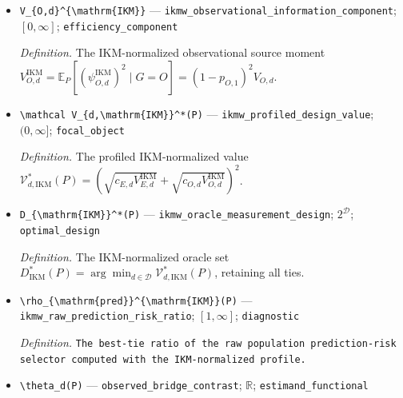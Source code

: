 \documentclass{article}
\begin{document}
\begin{itemize}
  \par\smallskip\noindent\emph{Definition.} The IKM-normalized experimental source moment \(V_{E,d}^{\mathrm{IKM}}=\mathbb E_P[(\psi_{E,d}^{\mathrm{IKM}})^2\mid G=E]=(1-p_{E,1})^2V_{E,d}\).
  \item \texttt{V\_\allowbreak{}\{O,\allowbreak{}d\}\allowbreak{}\textasciicircum{}\{\textbackslash{}\allowbreak{}mathrm\{IKM\}\allowbreak{}\}\allowbreak{}} --- \texttt{ikmw\_\allowbreak{}observational\_\allowbreak{}information\_\allowbreak{}component}; \([0,\infty]\); \texttt{efficiency\_\allowbreak{}component}
  \par\smallskip\noindent\emph{Definition.} The IKM-normalized observational source moment \(V_{O,d}^{\mathrm{IKM}}=\mathbb E_P[(\psi_{O,d}^{\mathrm{IKM}})^2\mid G=O]=(1-p_{O,1})^2V_{O,d}\).
  \item \texttt{\textbackslash{}\allowbreak{}mathcal V\_\allowbreak{}\{d,\allowbreak{}\textbackslash{}\allowbreak{}mathrm\{IKM\}\allowbreak{}\}\allowbreak{}\textasciicircum{}*(P)} --- \texttt{ikmw\_\allowbreak{}profiled\_\allowbreak{}design\_\allowbreak{}value}; \((0,\infty]\); \texttt{focal\_\allowbreak{}object}
  \par\smallskip\noindent\emph{Definition.} The profiled IKM-normalized value \(\mathcal V_{d,\mathrm{IKM}}^*(P)=(\sqrt{c_{E,d}V_{E,d}^{\mathrm{IKM}}}+\sqrt{c_{O,d}V_{O,d}^{\mathrm{IKM}}})^2\).
  \item \texttt{D\_\allowbreak{}\{\textbackslash{}\allowbreak{}mathrm\{IKM\}\allowbreak{}\}\allowbreak{}\textasciicircum{}*(P)} --- \texttt{ikmw\_\allowbreak{}oracle\_\allowbreak{}measurement\_\allowbreak{}design}; \(2^{\mathcal D}\); \texttt{optimal\_\allowbreak{}design}
  \par\smallskip\noindent\emph{Definition.} The IKM-normalized oracle set \(D_{\mathrm{IKM}}^*(P)=\arg\min_{d\in\mathcal D}\mathcal V_{d,\mathrm{IKM}}^*(P)\), retaining all ties.
  \item \texttt{\textbackslash{}\allowbreak{}rho\_\allowbreak{}\{\textbackslash{}\allowbreak{}mathrm\{pred\}\allowbreak{}\}\allowbreak{}\textasciicircum{}\{\textbackslash{}\allowbreak{}mathrm\{IKM\}\allowbreak{}\}\allowbreak{}(P)} --- \texttt{ikmw\_\allowbreak{}raw\_\allowbreak{}prediction\_\allowbreak{}risk\_\allowbreak{}ratio}; \([1,\infty]\); \texttt{diagnostic}
  \par\smallskip\noindent\emph{Definition.} \texttt{The best-\allowbreak{}tie ratio of the raw population prediction-\allowbreak{}risk selector computed with the IKM-\allowbreak{}normalized profile.}
  \item \texttt{\textbackslash{}\allowbreak{}theta\_\allowbreak{}d(P)} --- \texttt{observed\_\allowbreak{}bridge\_\allowbreak{}contrast}; \(\mathbb R\); \texttt{estimand\_\allowbreak{}functional}

\end{itemize}
\end{document}
